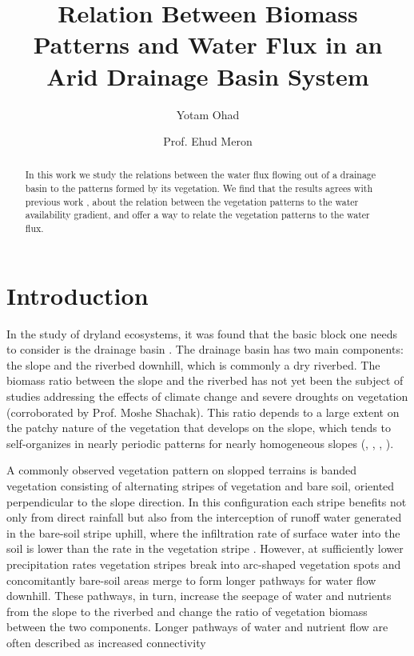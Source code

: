 \documentclass{article}
\title{Relation Between Biomass Patterns and Water Flux in an Arid Drainage Basin System}
\author{Yotam Ohad \and Prof. Ehud Meron}
\numberwithin{equation}{section}
\begin{document}
\maketitle

\begin{abstract}
In this work we study the relations between the water flux flowing out of a drainage basin to the patterns formed by its vegetation. We find that the results agrees with previous work \parencite[]{meron_vegetation_2004}, about the relation between the vegetation patterns to the water availability gradient, and offer a way to relate the vegetation patterns to the water flux.
\end{abstract}

\section{Introduction}
In the study of dryland ecosystems, it was found that the basic block one needs to consider is the drainage basin \parencite{yair_case_1982}. The drainage basin has two main components: the slope and the riverbed downhill, which is commonly a dry riverbed. The biomass ratio between the slope and the riverbed has not yet been the subject of studies addressing the effects of climate change and severe droughts on vegetation (corroborated by Prof. Moshe Shachak). This ratio depends to a large extent on the patchy nature of the vegetation that develops on the slope, which tends to self-organizes in nearly periodic patterns for nearly homogeneous slopes (\cite{lefever_origin_1997}, \cite{valentin_soil_1999}, \cite{klausmeier_regular_1999}, \cite{von_hardenberg_diversity_2001}).

A commonly observed vegetation pattern on slopped terrains is banded vegetation consisting of alternating stripes of vegetation and bare soil, oriented perpendicular to the slope direction. In this configuration each stripe benefits not only from direct rainfall but also from the interception of runoff water generated in the bare-soil stripe uphill, where the infiltration rate of surface water into the soil is lower than the rate in the vegetation stripe \parencite{meron_vegetation_2019}. However, at sufficiently lower precipitation rates vegetation stripes break into arc-shaped vegetation spots and concomitantly bare-soil areas merge to form longer pathways for water flow downhill. These pathways, in turn, increase the seepage of water and nutrients from the slope to the riverbed and change the ratio of vegetation biomass between the two components. Longer pathways of water and nutrient flow are often described as increased connectivity \parencite{okin_connectivity_2015}
\end{document}
